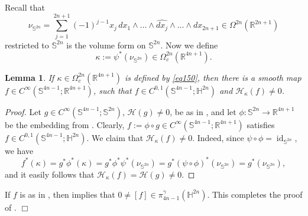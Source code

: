 \documentclass[intlimits,12pt,reqno]{amsart}
\newcommand{\Sph}{\mathbb S}
\newcommand{\bbbh}{\mathbb H}
\newcommand{\R}{\mathbb R}
\numberwithin{equation}{section}
\newtheorem{lemma}[theorem]{Lemma}
\theoremstyle{definition}
\newcommand{\HI}{\mathcal{H}}
\begin{document}
Recall that
$$
\nu_{\Sph^{2n}}=\sum_{j=1}^{2n+1} (-1)^{j-1}x_j\, dx_1\wedge\ldots\wedge\widehat{dx_j}\wedge\ldots\wedge dx_{2n+1}\in\Omega^{2n}(\R^{2n+1})
$$
restricted to $\Sph^{2n}$ is the volume form on $\Sph^{2n}$.
Now we define
\begin{equation}
\label{eq150}
\kappa:=
\psi^*(\nu_{\Sph^{2n}})\in\Omega_c^{2n}(\R^{4n+1}).
\end{equation}
\begin{lemma}
\label{T109}
If $\kappa\in\Omega_c^{2n}(\R^{4n+1})$ is defined by \eqref{eq150}, then there is a smooth map $f\in C^\infty(\Sph^{4n-1};\R^{4n+1})$, such that $f\in C^{0,1}(\Sph^{4n-1};\bbbh^{2n})$ and
$\HI_\kappa(f)\neq 0$.
\end{lemma}
\begin{proof}
Let $g\in C^\infty(\Sph^{4n-1};\Sph^{2n})$, $\HI(g)\neq 0$, be as in , and let $\phi:\Sph^{2n}\to\R^{4n+1}$ be the embedding from . Clearly,
$f:=\phi\circ g\in C^\infty(\Sph^{4n-1};\R^{4n+1})$ satisfies $f\in C^{0,1}(\Sph^{4n-1};\bbbh^{2n})$. We claim that
$\HI_\kappa(f)\neq 0$. Indeed, since $\psi\circ\phi=\operatorname{id}_{\Sph^{2n}}$, we have
$$
f^*(\kappa)=g^*\phi^*(\kappa)=g^*\phi^*\psi^*(\nu_{\Sph^{2n}})=g^*(\psi\circ\phi)^*(\nu_{\Sph^{2n}})
=g^*(\nu_{\Sph^{2n}}),
$$
and it easily follows that $\HI_\kappa(f)=\HI(g)\neq 0$.
\end{proof}
If $f$ is as in , then  implies that $0\neq [f]\in\pi^\gamma_{4n-1}(\bbbh^{2n})$. This completes the proof of .
\hfill $\Box$
\end{document}
